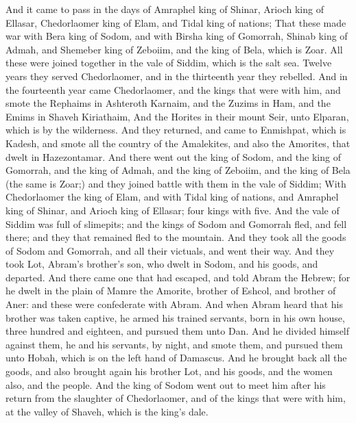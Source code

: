 \begin{biblechapter} %
 And it came to pass in the days of Amraphel king of Shinar, Arioch king of Ellasar, Chedorlaomer king of Elam, and Tidal king of nations;
\verse That these made war with Bera king of Sodom, and with Birsha king of Gomorrah, Shinab king of Admah, and Shemeber king of Zeboiim, and the king of Bela, which is Zoar.
\verse All these were joined together in the vale of Siddim, which is the salt sea.
\verse Twelve years they served Chedorlaomer, and in the thirteenth year they rebelled.
\verse And in the fourteenth year came Chedorlaomer, and the kings that were with him, and smote the Rephaims in Ashteroth Karnaim, and the Zuzims in Ham, and the Emims in Shaveh Kiriathaim,
\verse And the Horites in their mount Seir, unto Elparan, which is by the wilderness.
\verse And they returned, and came to Enmishpat, which is Kadesh, and smote all the country of the Amalekites, and also the Amorites, that dwelt in Hazezontamar.
\verse And there went out the king of Sodom, and the king of Gomorrah, and the king of Admah, and the king of Zeboiim, and the king of Bela (the same is Zoar;) and they joined battle with them in the vale of Siddim;
\verse With Chedorlaomer the king of Elam, and with Tidal king of nations, and Amraphel king of Shinar, and Arioch king of Ellasar; four kings with five.
\verse And the vale of Siddim was full of slimepits; and the kings of Sodom and Gomorrah fled, and fell there; and they that remained fled to the mountain.
\verse And they took all the goods of Sodom and Gomorrah, and all their victuals, and went their way.
\verse And they took Lot, Abram's brother's son, who dwelt in Sodom, and his goods, and departed.
\verse And there came one that had escaped, and told Abram the Hebrew; for he dwelt in the plain of Mamre the Amorite, brother of Eshcol, and brother of Aner: and these were confederate with Abram.
\verse And when Abram heard that his brother was taken captive, he armed his trained servants, born in his own house, three hundred and eighteen, and pursued them unto Dan.
\verse And he divided himself against them, he and his servants, by night, and smote them, and pursued them unto Hobah, which is on the left hand of Damascus.
\verse And he brought back all the goods, and also brought again his brother Lot, and his goods, and the women also, and the people.
\verse And the king of Sodom went out to meet him after his return from the slaughter of Chedorlaomer, and of the kings that were with him, at the valley of Shaveh, which is the king's dale.

\end{biblechapter}
